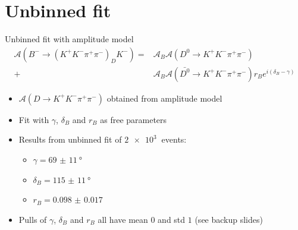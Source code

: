 \documentclass{beamer}
\begin{document}
\section{Unbinned fit}
\begin{frame}{Unbinned fit with amplitude model}
  \vspace{-0.3cm}
  \begin{align*}
    \mathcal{A}(B^-\to(K^+K^-\pi^+\pi^-)_DK^-) =& \mathcal{A}_B\mathcal{A}(D^0\to K^+K^-\pi^+\pi^-) \\
  +& \mathcal{A}_B\mathcal{A}(\bar{D^0}\to K^+K^-\pi^+\pi^-)r_Be^{i(\delta_B - \gamma)}
  \end{align*}
  \vspace{-0.5cm}
  \begin{itemize}
    \item{$\mathcal{A}(D\to K^+K^-\pi^+\pi^-)$ obtained from amplitude model}
    \item{Fit with $\gamma$, $\delta_B$ and $r_B$ as free parameters}
    \item{Results from unbinned fit of $\SI{2e3}{}$ events:}
    \begin{itemize}
      \item{$\gamma = \SI{69(11)}{\degree}$}
      \item{$\delta_B = \SI{115(11)}{\degree}$}
      \item{$r_B = \SI{0.098(17)}{}$}
    \end{itemize}
    \item{Pulls of $\gamma$, $\delta_B$ and $r_B$ all have mean $0$ and std $1$ (see backup slides)}
  \end{itemize}
\end{frame}
\end{document}
